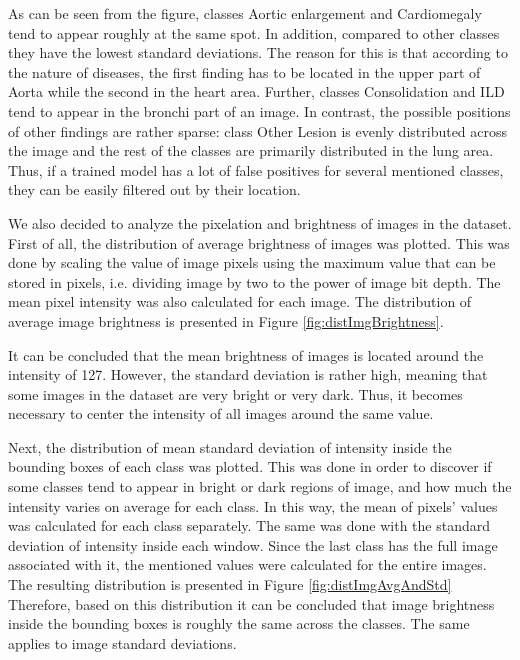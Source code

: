 \documentclass[conference]{IEEEtran}
\begin{document}
As can be seen from the figure, classes Aortic enlargement and Cardiomegaly tend to appear roughly at the same spot. In addition, compared to other classes they have the lowest standard deviations. The reason for this is that according to the nature of diseases, the first finding has to be located in the upper part of Aorta while the second in the heart area. Further, classes Consolidation and ILD tend to appear in the bronchi part of an image.  In contrast, the possible positions of other findings are rather sparse: class Other Lesion is evenly distributed across the image and the rest of the classes are primarily distributed in the lung area. Thus, if a trained model has a lot of false positives for several mentioned classes, they can be easily filtered out by their location. 

We also decided to analyze the pixelation and brightness of images in the dataset. First of all, the distribution of average brightness of images was plotted. This was done by scaling the value of image pixels using the maximum value that can be stored in pixels, i.e. dividing image by two to the power of image bit depth. The mean pixel intensity was also calculated for each image. The distribution of average image brightness is presented in Figure \ref{fig:distImgBrightness}.

It can be concluded that the mean brightness of images is located around the intensity of 127. However, the standard deviation is rather high, meaning that some images in the dataset are very bright or very dark. Thus, it becomes necessary to center the intensity of all images around the same value. 

Next, the distribution of mean standard deviation of intensity inside the bounding boxes of each class was plotted. This was done in order to discover if some classes tend to appear in bright or dark regions of image, and how much the intensity varies on average for each class. In this way, the mean of pixels’ values was calculated for each class separately. The same was done with the standard deviation of intensity inside each window. Since the last class has the full image associated with it, the mentioned values were calculated for the entire images. The resulting distribution is presented in Figure \ref{fig:distImgAvgAndStd} Therefore, based on this distribution it can be concluded that image brightness inside the bounding boxes is roughly the same across the classes.  The same applies to image standard deviations.
\end{document}
